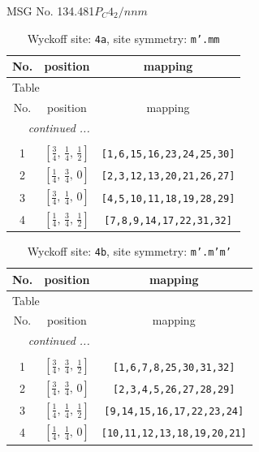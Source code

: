 \documentclass[fleqn,8pt]{jsarticle}
\begin{document}
\setcounter{MaxMatrixCols}{32}

\renewcommand{\tablename}{Table~}
\renewcommand{\figurename}{Figure~}
\begin{center}
\LARGE
MSG No. 134.481\quad$P_{C}4_{2}/nnm$
\end{center}
\renewcommand{\arraystretch}{1.2}
\begin{longtable}{ccc}
\caption{Wyckoff site: {\tt 4a}, site symmetry: {\tt m'.mm}}
 \\
 \hline \hline
No. & position & mapping \\ \hline \endfirsthead

\multicolumn{2}{l}{\tablename\ \thetable{}} \\
 \hline \hline
No. & position & mapping \\ \hline \endhead

 \hline \hline
\multicolumn{2}{r}{\footnotesize\it continued ...} \\ \endfoot

 \hline \hline
\multicolumn{2}{r}{} \\ \endlastfoot

1 & $\left[ \frac{3}{4},\, \frac{1}{4},\, \frac{1}{2} \right]$ & {\tt [1,6,15,16,23,24,25,30]} \\ \hline
2 & $\left[ \frac{1}{4},\, \frac{3}{4},\, 0 \right]$ & {\tt [2,3,12,13,20,21,26,27]} \\ \hline
3 & $\left[ \frac{3}{4},\, \frac{1}{4},\, 0 \right]$ & {\tt [4,5,10,11,18,19,28,29]} \\ \hline
4 & $\left[ \frac{1}{4},\, \frac{3}{4},\, \frac{1}{2} \right]$ & {\tt [7,8,9,14,17,22,31,32]} \\
\end{longtable}
\renewcommand{\arraystretch}{1.2}
\begin{longtable}{ccc}
\caption{Wyckoff site: {\tt 4b}, site symmetry: {\tt m'.m'm'}}
 \\
 \hline \hline
No. & position & mapping \\ \hline \endfirsthead

\multicolumn{2}{l}{\tablename\ \thetable{}} \\
 \hline \hline
No. & position & mapping \\ \hline \endhead

 \hline \hline
\multicolumn{2}{r}{\footnotesize\it continued ...} \\ \endfoot

 \hline \hline
\multicolumn{2}{r}{} \\ \endlastfoot

1 & $\left[ \frac{3}{4},\, \frac{3}{4},\, \frac{1}{2} \right]$ & {\tt [1,6,7,8,25,30,31,32]} \\ \hline
2 & $\left[ \frac{3}{4},\, \frac{3}{4},\, 0 \right]$ & {\tt [2,3,4,5,26,27,28,29]} \\ \hline
3 & $\left[ \frac{1}{4},\, \frac{1}{4},\, \frac{1}{2} \right]$ & {\tt [9,14,15,16,17,22,23,24]} \\ \hline
4 & $\left[ \frac{1}{4},\, \frac{1}{4},\, 0 \right]$ & {\tt [10,11,12,13,18,19,20,21]} \\
\end{longtable}
\end{document}
